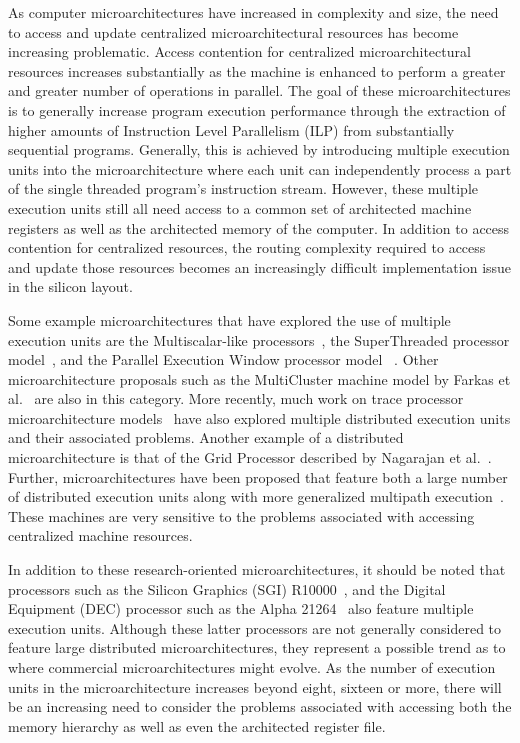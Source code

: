 As computer microarchitectures have increased in complexity and
size, the need to access and update centralized microarchitectural
resources has become increasing problematic.
Access contention for centralized microarchitectural resources
increases substantially as the machine is enhanced to perform
a greater and greater number of operations in parallel.
The goal of these microarchitectures is to generally increase
program execution performance through the extraction of higher
amounts of Instruction Level Parallelism (ILP) from substantially
sequential programs.
Generally, this is achieved by introducing multiple
execution units into the microarchitecture where each unit
can independently process a part of the single threaded program's
instruction stream.  
However, these multiple execution units
still all need access to a common set of architected machine registers
as well as the architected memory of the computer.
In addition to access contention for centralized resources,
the routing complexity required to access and update those
resources becomes an increasingly difficult implementation issue
in the silicon layout.

Some example microarchitectures that have explored the
use of multiple execution units are the Multiscalar-like
processors~\cite{Sohi95,sundararaman97multiscalar},
the SuperThreaded processor model~\cite{tsai96superthread},
and
the Parallel Execution Window processor model ~\cite{kemp96pew}.
Other microarchitecture proposals such as the MultiCluster machine
model by 
Farkas et al.~\cite{farkas97multicluster} are also in this category.
More recently, much work on trace processor microarchitecture 
models~\cite{rotenberg97trace,rotenberg99control,vajapeyam97sequences}
have also explored multiple distributed execution units and their associated
problems.
Another example of a distributed microarchitecture is that
of the Grid Processor described by Nagarajan et al.~\cite{ nagarajan01grid}.
Further, microarchitectures have been proposed that feature both
a large number of distributed execution units along with more
generalized multipath execution~\cite{morano02high,uht02realizing}.
These machines are very sensitive to the problems associated with accessing
centralized machine resources.

In addition to these research-oriented microarchitectures, it should
be noted that processors such as the 
Silicon Graphics (SGI) R10000~\cite{yeager96r10000}, 
and the Digital Equipment (DEC) processor such as the
Alpha 21264~\cite{kessler98alpha,leibholz97alpha}
also feature multiple execution units.
Although these latter processors are not generally considered to
feature large distributed microarchitectures, they represent a 
possible trend as to where commercial microarchitectures might evolve.
As the number of execution units in the microarchitecture increases
beyond eight, sixteen or more, there will be an increasing need
to consider the problems associated with accessing both
the memory hierarchy as well as even the architected register
file.

